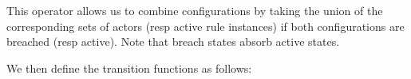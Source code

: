 \documentclass{article}
\begin{document}

This operator allows us to combine configurations by taking the union of the
corresponding sets of actors (resp active rule instances) if both
configurations are breached (resp active).
Note that breach states absorb active states.







We then define the transition functions as follows:
\end{document}
